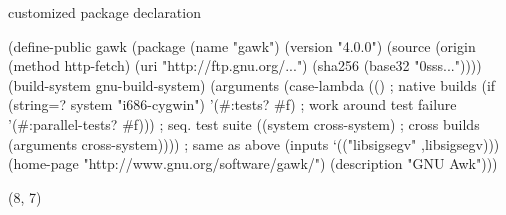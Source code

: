 \documentclass{beamer}
\begin{document}
\begin{frame}[fragile]{customized package declaration}
  \begin{semiverbatim}
    \vspace{-1.3cm}
    \small{
(define-public gawk
  (\alert{package}
   (name "gawk")
   (version "4.0.0")
   (source (origin (method http-fetch)
                   (uri "http://ftp.gnu.org/...")
                   (sha256 (base32 "0sss..."))))
   (build-system gnu-build-system)
   (\alert{arguments}
     (case-lambda
       (()                \alert{; native builds}
        (if (string=? system "i686-cygwin")
            '(#:tests? #f)      ; work around test failure
            '(#:parallel-tests? #f))) ; seq. test suite
       ((system cross-system)   \alert{; cross builds}
        (arguments cross-system)))) ; same as above
   (inputs `(("libsigsegv" ,libsigsegv)))
   (home-page "http://www.gnu.org/software/gawk/")
   (description "GNU Awk")))
   }
 \end{semiverbatim}

  \begin{textblock}{5}(8, 7)
  \end{textblock}

\end{frame}
\end{document}
